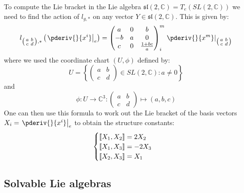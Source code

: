         \begin{example}[$SL(2, \mathbb{C})$]
        	To compute the Lie bracket in the Lie algebra $\mathfrak{sl}(2, \mathbb{C}) = T_e(SL(2, \mathbb{C}))$ we need to find the action of $l_{g, *}$ on any vector $Y\in\mathfrak{sl}(2, \mathbb{C})$. This is given by:
        	\begin{equation}
        		l_{\left(\begin{smallmatrix}a&b\\c&d\end{smallmatrix}\right), *}\left(\left.\pderiv{}{x^i}\right|_e\right)
        		= \left(\begin{matrix}a&0&b\\-b&a&0\\c&0&\frac{1+bc}{a}\end{matrix}\right)^m_i\left.\pderiv{}{x^m}\right|_{\left(\begin{smallmatrix}a&b\\c&d\end{smallmatrix}\right)}
        	\end{equation}
        	where we used the coordinate chart $(U, \phi)$ defined by: \[U = \left\{\left(\begin{matrix}a&b\\c&d\end{matrix}\right)\in SL(2, \mathbb{C}): a\neq0\right\}\] and \[\phi:U\rightarrow\mathbb{C}^3:\left(\begin{matrix}a&b\\c&d\end{matrix}\right)\mapsto(a, b, c)\]
        	One can then use this formula to work out the Lie bracket of the basis vectors $X_i = \left.\pderiv{}{x^i}\right|_e$ to obtain the structure constants:
        	\begin{equation}
        		\label{lie:sl2c_lie_brackets}
        		\begin{cases}
        			\text{\textlbrackdbl}X_1, X_2\text{\textrbrackdbl} = 2X_2\\
        			\text{\textlbrackdbl}X_1, X_3\text{\textrbrackdbl} = -2X_3\\
        			\text{\textlbrackdbl}X_2, X_3\text{\textrbrackdbl} = X_1
        		\end{cases}
        	\end{equation}
        \end{example}

\subsection{Solvable Lie algebras}

